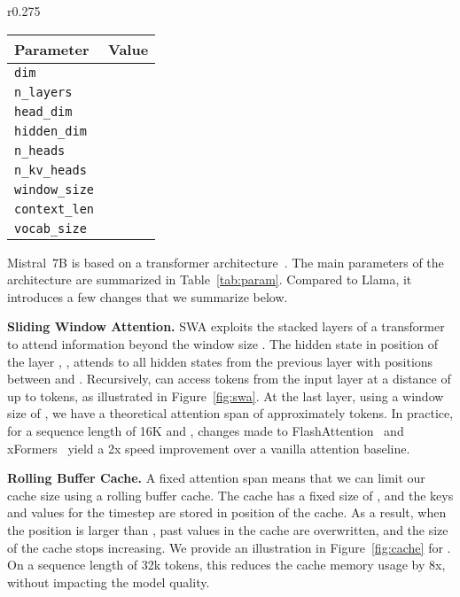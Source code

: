 \documentclass{article}
\def\llama{Llama\xspace}
\def\mistral{Mistral~7B\xspace}
\begin{document}
\begin{wrapfigure}{r}{0.275\textwidth}
\center
\small
\vspace{-15pt}
\begin{tabular}{lr}
\toprule
\textbf{Parameter}  & \textbf{Value} \\ \midrule
\texttt{dim}             &            \\
\texttt{n\_layers}       &              \\
\texttt{head\_dim}       &             \\
\texttt{hidden\_dim}     &           \\
\texttt{n\_heads}        &              \\
\texttt{n\_kv\_heads}    &               \\
\texttt{window\_size}    &            \\
\texttt{context\_len}    &            \\
\texttt{vocab\_size}     &           \\ \bottomrule
\end{tabular}
\label{tab:param}
\vspace{-8pt}
\end{wrapfigure}

\mistral is based on a transformer architecture~\cite{vaswani2017attention}. The main parameters of the architecture are summarized in Table~\ref{tab:param}. Compared to \llama, it introduces a few changes that we summarize below.

 \textbf{Sliding Window Attention.} SWA exploits the stacked layers of a transformer to attend information beyond the window size .
The hidden state in position  of the layer , , attends to all hidden states from the previous layer with positions between  and .
Recursively,  can access tokens from the input layer at a distance of up to  tokens, as illustrated in Figure~\ref{fig:swa}.
At the last layer, using a window size of , we have a theoretical attention span of approximately  tokens.
In practice, for a sequence length of 16K and , changes made to FlashAttention~\cite{dao2022flashattention} and xFormers~\cite{xFormers2022} yield a 2x speed improvement over a vanilla attention baseline.


 \textbf{Rolling Buffer Cache.} A fixed attention span means that we can limit our cache size using a rolling buffer cache.
The cache has a fixed size of , and the keys and values for the timestep  are stored in position  of the cache. As a result, when the position  is larger than , past values in the cache are overwritten, and the size of the cache stops increasing. We provide an illustration in Figure~\ref{fig:cache} for .
On a sequence length of 32k tokens, this reduces the cache memory usage by 8x, without impacting the model quality.
\end{document}
